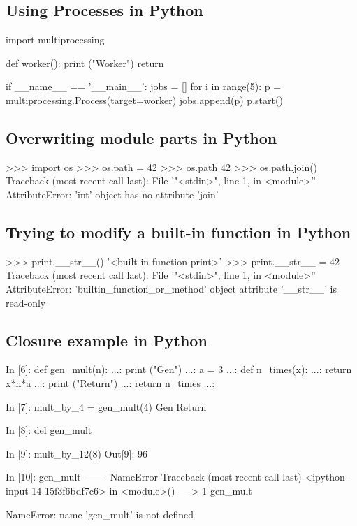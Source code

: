 \documentclass[12pt,a4paper]{scrartcl}
\begin{document}
\subsection{Using Processes in Python}
\label{code:pythonProcesses}
\begin{python}
import multiprocessing

def worker():
    print ("Worker")
    return

if __name__ == '__main__':
    jobs = []
    for i in range(5):
        p = multiprocessing.Process(target=worker)
        jobs.append(p)
        p.start()

\end{python}

\subsection{Overwriting module parts in Python}
\label{code:overwriting}
\begin{python}
>>> import os
>>> os.path = 42
>>> os.path
42
>>> os.path.join()
Traceback (most recent call last):
  File '"<stdin>", line 1, in <module>''
AttributeError: 'int' object has no attribute 'join'
\end{python}


\subsection{Trying to modify a built-in function in Python}
\label{code:pythonBuiltinModif}
\begin{python}
>>> print.__str__()
'<built-in function print>'
>>> print.__str__ = 42
Traceback (most recent call last):
  File '"<stdin>", line 1, in <module>''
AttributeError: 'builtin_function_or_method' object attribute '__str__' is read-only
\end{python}

\subsection{Closure example in Python}
\label{code:pythonClosure}
\begin{python}
In [6]: def gen_mult(n):
   ...:         print ("Gen")
   ...:         a = 3
   ...:         def n_times(x):
   ...:                 return x*n*a
   ...:         print ("Return")
   ...:         return n_times
   ...: 

In [7]: mult_by_4 = gen_mult(4)
Gen
Return

In [8]: del gen_mult

In [9]: mult_by_12(8)
Out[9]: 96

In [10]: gen_mult
-------
NameError                                 Traceback (most recent call last)
<ipython-input-14-15f3f6bdf7c6> in <module>()
----> 1 gen_mult

NameError: name 'gen_mult' is not defined

\end{python}
\end{document}
